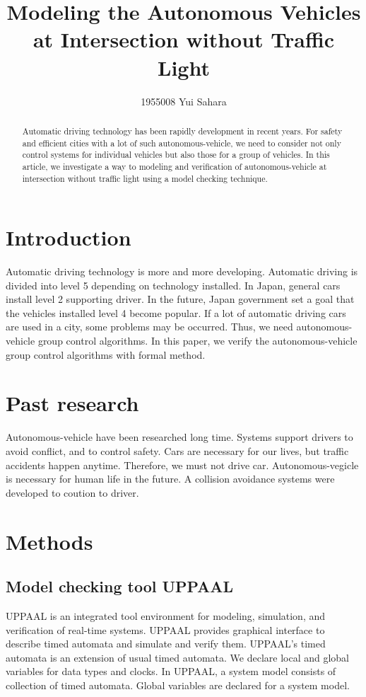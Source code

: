 \documentclass[]{article}
\title{Modeling the Autonomous Vehicles at Intersection without Traffic Light}
\author{1955008	Yui Sahara}
\date{}
\begin{document}
\maketitle
\begin{abstract}
	Automatic driving technology has been rapidly development in recent years.  For safety and efficient cities with a lot of such autonomous-vehicle, we need to consider not only control systems for individual vehicles but also those for a group of vehicles.  In this article, we investigate a way to modeling and verification of autonomous-vehicle at intersection without traffic light using a model checking technique.
\end{abstract}

\section{Introduction}
	  Automatic driving technology is more and more developing.  Automatic driving is divided into level  5 depending on technology installed.  In Japan, general cars install level 2 supporting driver.  In the future,  Japan government set a goal that the vehicles installed level 4 become popular.  If a lot of automatic driving cars are used in a city, some problems may be occurred.  Thus, we need autonomous-vehicle group control algorithms.  In this paper, we verify the autonomous-vehicle group control algorithms with formal method.
\section{Past research}
	Autonomous-vehicle have been researched long time.  Systems support drivers to avoid conflict, and to control safety.  Cars are necessary for our lives, but traffic accidents happen anytime.  Therefore, we must not drive car.  Autonomous-vegicle is necessary for human life in the future.  A collision avoidance systems were developed to coution to driver.   
\section{Methods}
	\subsection{Model checking tool UPPAAL}
		UPPAAL is an integrated tool environment for modeling, simulation, and verification of real-time systems.  UPPAAL provides graphical interface to describe timed automata and simulate and verify them. UPPAAL's timed automata is an extension of usual timed automata.  We declare local and global variables for data types and clocks. In UPPAAL, a system model consists of collection of timed automata.  Global variables are declared for a system model.  
\end{document}
